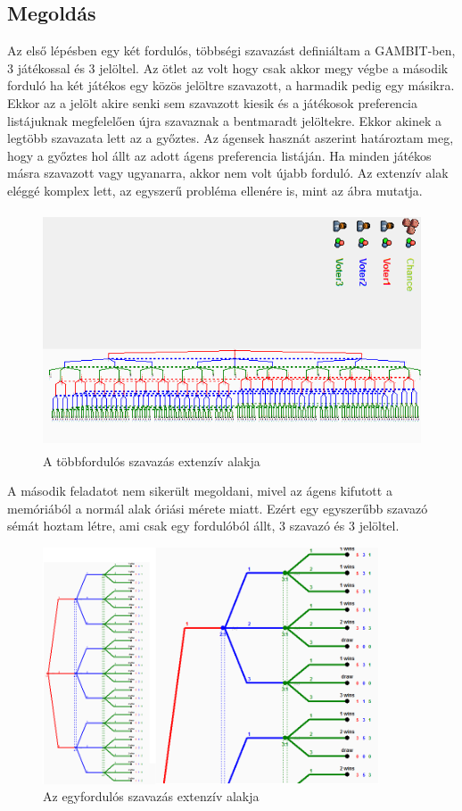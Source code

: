 \subsection{Megoldás}
Az első lépésben egy két fordulós, többségi szavazást definiáltam a GAMBIT-ben, 3 játékossal és 3 jelöltel. Az ötlet az volt hogy csak akkor megy végbe a második forduló ha két játékos egy közös jelöltre szavazott, a harmadik pedig egy másikra. Ekkor az a jelölt akire senki sem szavazott kiesik és a játékosok preferencia listájuknak megfelelően újra szavaznak a bentmaradt jelöltekre. Ekkor akinek a legtöbb szavazata lett az a győztes. Az ágensek hasznát aszerint határoztam meg, hogy a győztes hol állt az adott ágens preferencia listáján. Ha minden játékos másra szavazott vagy ugyanarra, akkor nem volt újabb forduló. Az extenzív alak eléggé komplex lett, az egyszerű probléma ellenére is, mint az ábra mutatja.
\begin{figure}[h]
\begin{center}
\includegraphics[height=7cm]{figures/voting_big.png}
\caption{A többfordulós szavazás extenzív alakja}
\end{center}
\end{figure}
A második feladatot nem sikerült megoldani, mivel az ágens kifutott a memóriából a normál alak óriási mérete miatt. Ezért egy egyszerűbb szavazó sémát hoztam létre, ami csak egy fordulóból állt, 3 szavazó és 3 jelöltel.
\begin{figure}[h]
\begin{center}
\includegraphics[height=7cm]{figures/voting_small.png}
\caption{Az egyfordulós szavazás extenzív alakja}
\end{center}
\end{figure}
